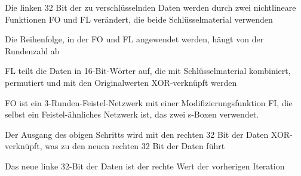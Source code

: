 \documentclass[a4paper]{article}
\begin{document}
\begin{multicols}{3}

      \begin{itemize*}
            \item Die linken 32 Bit der zu verschlüsselnden Daten werden durch zwei nichtlineare Funktionen FO und FL verändert, die beide Schlüsselmaterial verwenden
            \item Die Reihenfolge, in der FO und FL angewendet werden, hängt von der Rundenzahl ab
            \item FL teilt die Daten in 16-Bit-Wörter auf, die mit Schlüsselmaterial kombiniert, permutiert und mit den Originalwerten XOR-verknüpft werden
            \item FO ist ein 3-Runden-Feistel-Netzwerk mit einer Modifizierungsfunktion FI, die selbst ein Feistel-ähnliches Netzwerk ist, das zwei s-Boxen verwendet.
            \item Der Ausgang des obigen Schritts wird mit den rechten 32 Bit der Daten XOR-verknüpft, was zu den neuen rechten 32 Bit der Daten führt
            \item Das neue linke 32-Bit der Daten ist der rechte Wert der vorherigen Iteration
      \end{itemize*}


\end{multicols}
\end{document}
